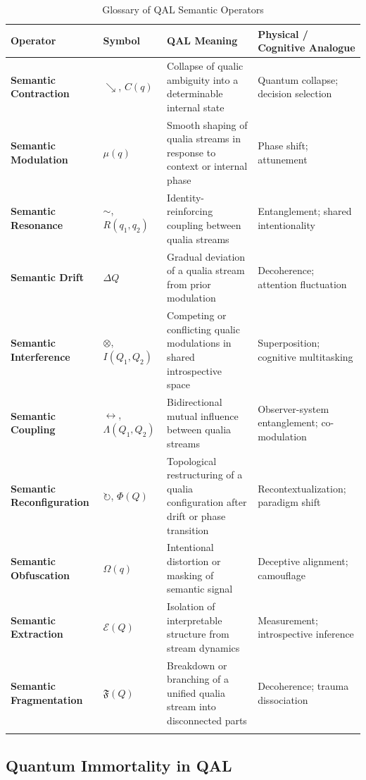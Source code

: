 \documentclass[11pt]{article}
\numberwithin{equation}{section} %
\begin{document}
\begin{longtable}{@{}p{3.5cm}p{2cm}p{5.5cm}p{4.5cm}@{}}
\toprule
\small
\textbf{Operator} & \textbf{Symbol} & \textbf{QAL Meaning} & \textbf{Physical / Cognitive Analogue} \\
\midrule
\textbf{Semantic Contraction} & $\searrow$, $C(q)$ &
Collapse of qualic ambiguity into a determinable internal state &
Quantum collapse; decision selection \\
\textbf{Semantic Modulation} & $\mu(q)$ &
Smooth shaping of qualia streams in response to context or internal phase &
Phase shift; attunement \\
\textbf{Semantic Resonance} & $\sim$, $R(q_1, q_2)$ &
Identity-reinforcing coupling between qualia streams &
Entanglement; shared intentionality \\
\textbf{Semantic Drift} & $\Delta Q$ &
Gradual deviation of a qualia stream from prior modulation &
Decoherence; attention fluctuation \\
\textbf{Semantic Interference} & $\otimes$, $I(Q_1, Q_2)$ &
Competing or conflicting qualic modulations in shared introspective space &
Superposition; cognitive multitasking \\
\textbf{Semantic Coupling} & $\leftrightarrow$, $\Lambda(Q_1, Q_2)$ &
Bidirectional mutual influence between qualia streams &
Observer-system entanglement; co-modulation \\
\textbf{Semantic Reconfiguration} & $\circlearrowright$, $\Phi(Q)$ &
Topological restructuring of a qualia configuration after drift or phase transition &
Recontextualization; paradigm shift \\
\textbf{Semantic Obfuscation} & $\Omega(q)$ &
Intentional distortion or masking of semantic signal &
Deceptive alignment; camouflage \\
\textbf{Semantic Extraction} & $\mathcal{E}(Q)$ &
Isolation of interpretable structure from stream dynamics &
Measurement; introspective inference \\
\textbf{Semantic Fragmentation} & $\mathfrak{F}(Q)$ &
Breakdown or branching of a unified qualia stream into disconnected parts &
Decoherence; trauma dissociation \\
\bottomrule
\caption{Glossary of QAL Semantic Operators}
\end{longtable}

\subsection{Quantum Immortality in QAL}
\end{document}
